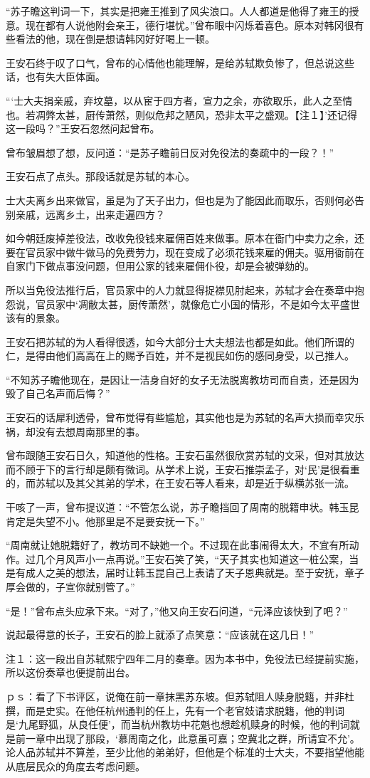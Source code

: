 “苏子瞻这判词一下，其实是把雍王推到了风尖浪口。人人都道是他得了雍王的授意。现在都有人说他附会亲王，德行堪忧。”曾布眼中闪烁着喜色。原本对韩冈很有些看法的他，现在倒是想请韩冈好好喝上一顿。

王安石终于叹了口气，曾布的心情他也能理解，是给苏轼欺负惨了，但总说这些话，也有失大臣体面。

“‘士大夫捐亲戚，弃坟墓，以从宦于四方者，宣力之余，亦欲取乐，此人之至情也。若凋弊太甚，厨传萧然，则似危邦之陋风，恐非太平之盛观。【注１】’还记得这一段吗？”王安石忽然问起曾布。

曾布皱眉想了想，反问道：“是苏子瞻前日反对免役法的奏疏中的一段？！”

王安石点了点头。那段话就是苏轼的本心。

士大夫离乡出来做官，虽是为了天子出力，但也是为了能因此而取乐，否则何必告别亲戚，远离乡土，出来走遍四方？

如今朝廷废掉差役法，改收免役钱来雇佣百姓来做事。原本在衙门中卖力之余，还要在官员家中做牛做马的免费劳力，现在变成了必须花钱来雇的佣夫。驱用衙前在自家门下做点事没问题，但用公家的钱来雇佣仆役，却是会被弹劾的。

所以当免役法推行后，官员家中的人力就显得捉襟见肘起来，苏轼才会在奏章中抱怨说，官员家中‘凋敝太甚，厨传萧然’，就像危亡小国的情形，不是如今太平盛世该有的景象。

王安石把苏轼的为人看得很透，如今大部分士大夫想法也都是如此。他们所谓的仁，是得由他们高高在上的赐予百姓，并不是视民如伤的感同身受，以己推人。

“不知苏子瞻他现在，是因让一洁身自好的女子无法脱离教坊司而自责，还是因为毁了自己名声而后悔？”

王安石的话犀利透骨，曾布觉得有些尴尬，其实他也是为苏轼的名声大损而幸灾乐祸，却没有去想周南那里的事。

曾布跟随王安石日久，知道他的性格。王安石虽然很欣赏苏轼的文采，但对其放达而不顾于下的言行却是颇有微词。从学术上说，王安石推崇孟子，对‘民’是很看重的，而苏轼以及其父其弟的学术，在王安石等人看来，却是近于纵横苏张一流。

干咳了一声，曾布提议道：“不管怎么说，苏子瞻挡回了周南的脱籍申状。韩玉昆肯定是失望不小。他那里是不是要安抚一下。”

“周南就让她脱籍好了，教坊司不缺她一个。不过现在此事闹得太大，不宜有所动作。过几个月风声小一点再说。”王安石笑了笑，“天子其实也知道这一桩公案，当是有成人之美的想法，届时让韩玉昆自己上表请了天子恩典就是。至于安抚，章子厚会做的，子宣你就别管了。”

“是！”曾布点头应承下来。“对了，”他又向王安石问道，“元泽应该快到了吧？”

说起最得意的长子，王安石的脸上就添了点笑意：“应该就在这几日！”

注１：这一段出自苏轼熙宁四年二月的奏章。因为本书中，免役法已经提前实施，所以这份奏章也便提前出台。

ｐｓ：看了下书评区，说俺在前一章抹黑苏东坡。但苏轼阻人赎身脱籍，并非杜撰，而是史实。在他任杭州通判的任上，先有一个老官妓请求脱籍，他的判词是‘九尾野狐，从良任便’，而当杭州教坊中花魁也想趁机赎身的时候，他的判词就是前一章中出现了那段，‘慕周南之化，此意虽可嘉；空冀北之群，所请宜不允’。论人品苏轼并不算差，至少比他的弟弟好，但他是个标准的士大夫，不要指望他能从底层民众的角度去考虑问题。

